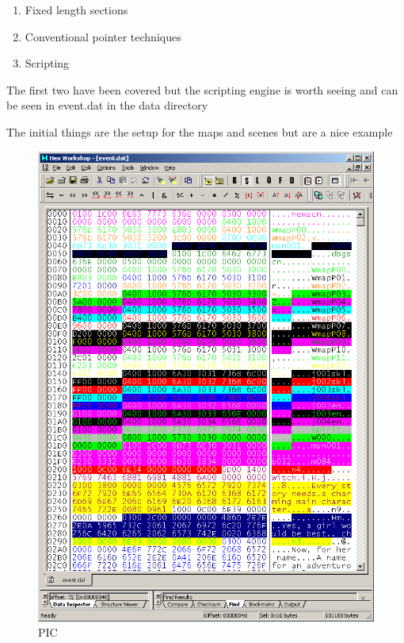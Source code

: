 \documentclass[
]{book}
\providecommand{\tightlist}{%
  \setlength{\itemsep}{0pt}\setlength{\parskip}{0pt}}
\begin{document}
\begin{enumerate}
\def\labelenumi{\arabic{enumi}.}
\tightlist
\item
  Fixed length sections
\item
  Conventional pointer techniques
\item
  Scripting
\end{enumerate}

The first two have been covered but the scripting engine is worth seeing and can be seen in event.dat in the data directory

The initial things are the setup for the maps and scenes but are a nice example

\begin{figure}
\centering
\includegraphics{images/124_home_fast6191_romhackingguide_unrenamed_fil___original_borders_romhackguidetextscripting1.png}
\caption{PIC}
\end{figure}
\end{document}
